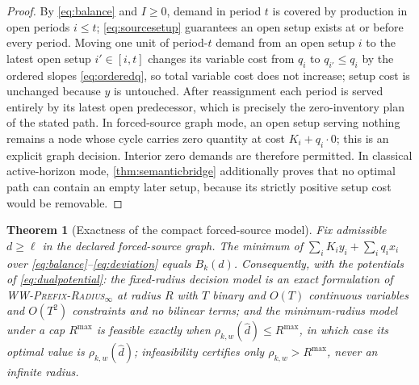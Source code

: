 \documentclass[11pt]{article}
\newtheorem{theorem}{Theorem}[section]
\theoremstyle{definition}
\newcommand{\WWR}{\textsc{WW-Prefix-Radius}\ensuremath{_{\infty}}}
\newcommand{\dhat}{\widehat d}
\newcommand{\ellv}{\ell}
\begin{document}
\begin{proof}
By \eqref{eq:balance} and $I\ge0$, demand in period $t$ is covered by
production in open periods $i\le t$; \eqref{eq:sourcesetup} guarantees an
open setup exists at or before every period. Moving one unit of
period-$t$ demand from an open setup $i$ to the latest open setup
$i'\in[i,t]$ changes its variable cost from $q_i$ to $q_{i'}\le q_i$ by
the ordered slopes \eqref{eq:orderedq}, so total variable cost does not
increase; setup cost is unchanged because $y$ is untouched. After
reassignment each period is served entirely by its latest open
predecessor, which is precisely the zero-inventory plan of the stated
path. In forced-source graph mode, an open setup serving nothing remains a
node whose cycle carries zero quantity at cost $K_i+q_i\cdot0$; this is an
explicit graph decision. Interior zero demands are therefore permitted. In
classical active-horizon mode, \cref{thm:semanticbridge} additionally proves
that no optimal path can contain an empty later setup, because its strictly
positive setup cost would be removable.
\end{proof}

\begin{theorem}[Exactness of the compact forced-source model]\label{thm:compact}
Fix admissible $d\ge\ellv$ in the declared forced-source graph. The minimum of
$\sum_iK_iy_i+\sum_iq_ix_i$ over
\eqref{eq:balance}--\eqref{eq:deviation} equals $B_k(d)$. Consequently,
with the potentials of \eqref{eq:dualpotential}: the fixed-radius
decision model is an exact formulation of \WWR{} at radius $R$ with
$T$ binary and $O(T)$ continuous variables and $O(T^2)$ constraints and
no bilinear terms; and the minimum-radius model under a cap $R^{\max}$ is feasible exactly
when $\rho_{k,w}(\dhat)\le R^{\max}$, in which case its optimal value is
$\rho_{k,w}(\dhat)$; infeasibility certifies only
$\rho_{k,w}>R^{\max}$, never an infinite radius.
\end{theorem}
\end{document}
